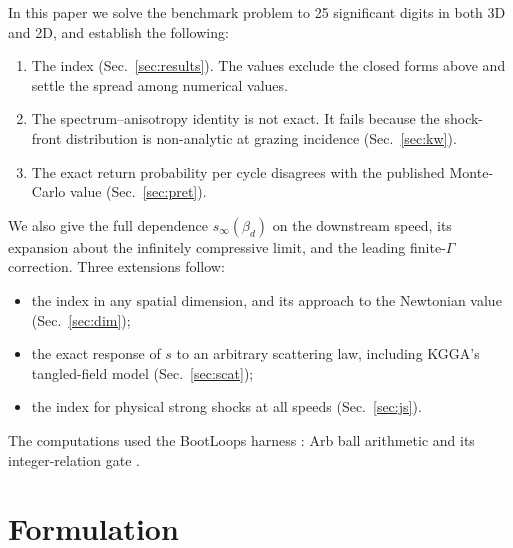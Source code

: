 \documentclass[aps,prd,twocolumn,superscriptaddress,nofootinbib,floatfix]{revtex4-2}
\newcommand{\sinf}{s_\infty}
\newcommand{\bd}{\beta_d}
\begin{document}
In this paper we solve the benchmark problem to 25 significant digits in both 3D and 2D, and establish the
following:
\begin{enumerate}
\item The index (Sec.~\ref{sec:results}). The values exclude the closed forms above and settle the spread among
  numerical values.
\item The spectrum--anisotropy identity is not exact. It fails because the shock-front distribution is
  non-analytic at grazing incidence (Sec.~\ref{sec:kw}).
\item The exact return probability per cycle disagrees with the published Monte-Carlo value
  (Sec.~\ref{sec:pret}).
\end{enumerate}
We also give the full dependence $\sinf(\bd)$ on the downstream speed, its expansion about the infinitely
compressive limit, and the leading finite-$\Gamma$ correction. Three extensions follow:
\begin{itemize}
\item the index in any spatial dimension, and its approach to the Newtonian value (Sec.~\ref{sec:dim});
\item the exact response of $s$ to an arbitrary scattering law, including KGGA's tangled-field model
  (Sec.~\ref{sec:scat});
\item the index for physical strong shocks at all speeds (Sec.~\ref{sec:js}).
\end{itemize} The computations used the BootLoops harness
\cite{BootLoops}: Arb ball arithmetic \cite{Johansson2017} and its integer-relation gate
\cite{FergusonBaileyArno1999}.

\section{Formulation}
\label{sec:form}
\end{document}
